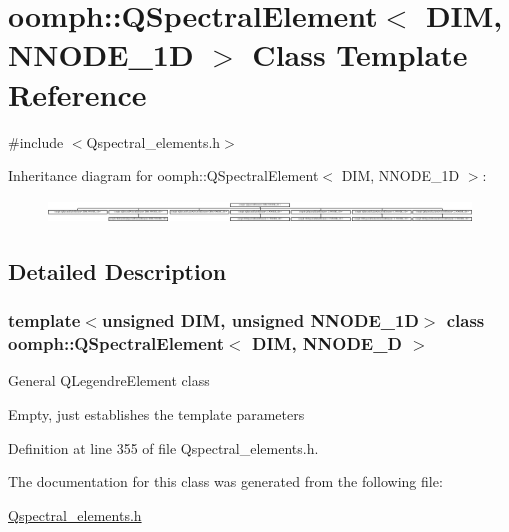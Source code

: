 \hypertarget{classoomph_1_1QSpectralElement}{}\section{oomph\+:\+:Q\+Spectral\+Element$<$ D\+IM, N\+N\+O\+D\+E\+\_\+1D $>$ Class Template Reference}
\label{classoomph_1_1QSpectralElement}


{\ttfamily \#include $<$Qspectral\+\_\+elements.\+h$>$}

Inheritance diagram for oomph\+:\+:Q\+Spectral\+Element$<$ D\+IM, N\+N\+O\+D\+E\+\_\+1D $>$\+:\begin{figure}[H]
\begin{center}
\leavevmode
\includegraphics[height=0.612245cm]{classoomph_1_1QSpectralElement}
\end{center}
\end{figure}


\subsection{Detailed Description}
\subsubsection*{template$<$unsigned D\+IM, unsigned N\+N\+O\+D\+E\+\_\+1D$>$\newline
class oomph\+::\+Q\+Spectral\+Element$<$ D\+I\+M, N\+N\+O\+D\+E\+\_\+D $>$}

General Q\+Legendre\+Element class

Empty, just establishes the template parameters 

Definition at line 355 of file Qspectral\+\_\+elements.\+h.



The documentation for this class was generated from the following file\+:\begin{DoxyCompactItemize}
\item 
\hyperlink{Qspectral__elements_8h}{Qspectral\+\_\+elements.\+h}\end{DoxyCompactItemize}
